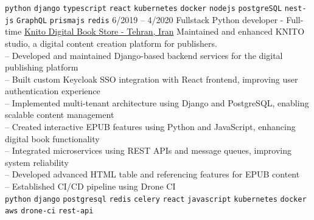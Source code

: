 \begin{entrylist}
{        \texttt{python}\slashsep
        \texttt{django}\slashsep
        \texttt{typescript}\slashsep
        \texttt{react}\slashsep
        \texttt{kubernetes}\slashsep
        \texttt{docker}\slashsep
        \texttt{nodejs}\slashsep
        \texttt{postgreSQL}\slashsep
        \texttt{nest-js}\slashsep
        \texttt{GraphQL}\slashsep
        \texttt{prismajs}\slashsep
        \texttt{redis}\slashsep
    }
    \entry
    {6/2019 -- 4/2020}
    {Fullstack Python developer - Full-time}
    {
        \href{https://knito.com/}{Knito Digital Book Store - Tehran, Iran}}
    {
        Maintained and enhanced KNITO studio, a digital content creation platform for publishers. \\
        -- Developed and maintained Django-based backend services for the digital publishing platform \\
        -- Built custom Keycloak SSO integration with React frontend, improving user authentication experience \\
        -- Implemented multi-tenant architecture using Django and PostgreSQL, enabling scalable content management \\
        -- Created interactive EPUB features using Python and JavaScript, enhancing digital book functionality \\
        -- Integrated microservices using REST APIs and message queues, improving system reliability \\
        -- Developed advanced HTML table and referencing features for EPUB content \\
        -- Established CI/CD pipeline using Drone CI\\
        \texttt{python}\slashsep
        \texttt{django}\slashsep
        \texttt{postgresql}\slashsep
        \texttt{redis}\slashsep
        \texttt{celery}\slashsep
        \texttt{react}\slashsep
        \texttt{javascript}\slashsep
        \texttt{kubernetes}\slashsep
        \texttt{docker}\slashsep
        \texttt{aws}\slashsep
        \texttt{drone-ci}\slashsep
        \texttt{rest-api}\slashsep
    }
\end{entrylist}


